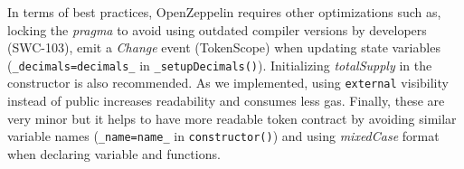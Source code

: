 In terms of best practices, OpenZeppelin requires other optimizations such as, locking the \textit{pragma} to avoid using outdated compiler versions by developers (\cf SWC-103), emit a \textit{Change} event (\cf TokenScope\cite{TokenScope}) when updating state variables (\eg \texttt{\_decimals=decimals\_} in \texttt{\_setupDecimals()}). Initializing \textit{totalSupply} in the constructor is also recommended. As we implemented, using \texttt{external} visibility instead of public increases readability and consumes less gas. Finally, these are very minor but it helps to have more readable token contract by avoiding similar variable names (\eg \texttt{\_name=name\_} in \texttt{constructor()}) and using \textit{mixedCase} format when declaring variable and functions.









%

